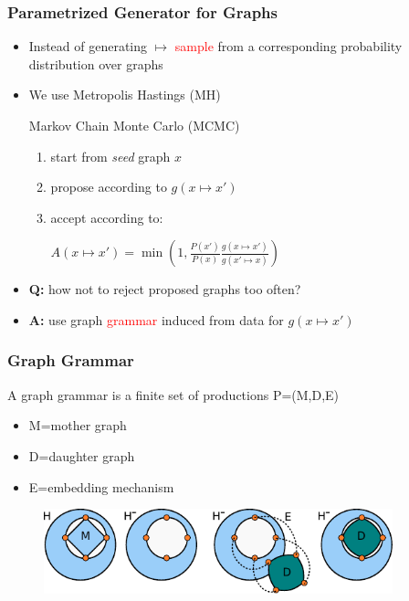 \documentclass{beamer}
\newcommand{\red}[1]{\textcolor{red}{#1}}
\begin{document}
\begin{frame}
    \frametitle{Parametrized Generator for Graphs}
    \begin{itemize}
        \item Instead of generating $\mapsto$ \red{sample} from a corresponding probability distribution over graphs
        \item We use Metropolis Hastings (MH) \begin{tiny}Markov Chain Monte Carlo (MCMC)\end{tiny}
        \begin{enumerate}
            \item start from {\em seed} graph $x$
            \item propose according to $g(x \mapsto x')$
            \item accept according to: \\
            \begin{center}
            $A(x \mapsto x')=\min(1, \frac{P(x')}{P(x)} \frac{g(x \mapsto x')}{g(x' \mapsto x)})$
            \end{center}
        \end{enumerate}
        \item {\bf Q:} how not to reject proposed graphs too often?
        \item {\bf A:} use graph \red{grammar} induced from data  for $g(x \mapsto x')$
    \end{itemize}
\end{frame}

\begin{frame}
    \frametitle{Graph Grammar}
    A graph grammar is a finite set of productions P=(M,D,E) 
    \begin{itemize}
        \item M=mother graph
        \item D=daughter graph
        \item E=embedding mechanism
    \end{itemize}
    \begin{figure}[ht]
        \centering
        \includegraphics[width=0.9\textwidth]{images/grammar.pdf}
    \end{figure}
\end{frame}
\end{document}

